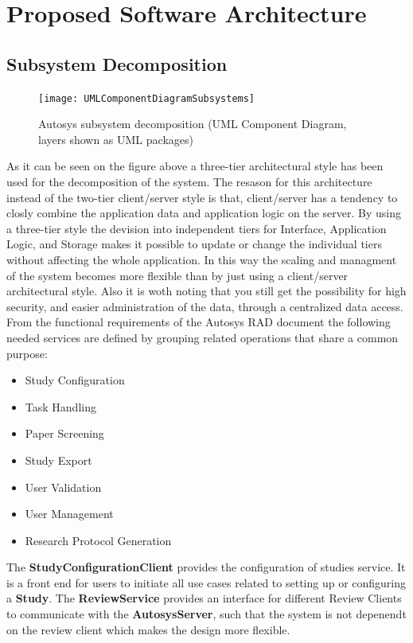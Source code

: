 \section{Proposed Software Architecture}
\subsection{Subsystem Decomposition}
\begin{figure}[H]
	\texttt{[image: UMLComponentDiagramSubsystems]}
	\caption{Autosys subsystem decomposition (UML Component Diagram, layers shown as UML packages)}
	\label{fig:Subsystem Decomposition, UML Component Diagram}
\end{figure}
As it can be seen on the figure above a three-tier architectural style has been used for the decomposition of the system. The resason for this architecture instead of the two-tier client/server style is that, client/server has a tendency to closly combine the application data and application logic on the server. By using a three-tier style the devision into independent tiers for Interface, Application Logic, and Storage makes it possible to update or change the individual tiers without affecting the whole application. In this way the scaling and managment of the system becomes more flexible than by just using a client/server architectural style.
Also it is woth noting that you still get the possibility for high security, and easier administration of the data, through a centralized data access.\\
From the functional requirements of the Autosys RAD document the following needed services are defined by grouping related operations that share a common purpose:\\
\begin{itemize}
	\item Study Configuration
	\item Task Handling
	\item Paper Screening
	\item Study Export
	\item User Validation
	\item User Management
	\item Research Protocol Generation
\end{itemize}
The \textbf{StudyConfigurationClient} provides the configuration of studies service. It is a front end for users to initiate all use cases related to setting up or configuring a \textbf{Study}.
The \textbf{ReviewService} provides an interface for different Review Clients to communicate with the \textbf{AutosysServer}, such that the system is not depenendt on the review client which makes the design more flexible.
